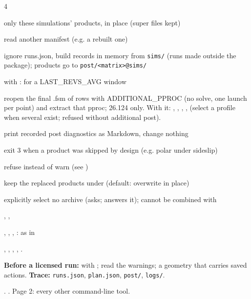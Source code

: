 \begin{multicols}{4}
\begin{flags}
\item {} only these simulations' products, in place (super files kept)
\item {} read another manifest (e.g. a rebuilt one)
\item {} ignore runs.json, build records in memory from \texttt{sims/} (runs made outside the package); products go to \texttt{post/<matrix>@sims/}
\item {} with : for a LAST\_REVS\_AVG window
\item {} reopen the final .fsm of rows with ADDITIONAL\_PPROC (no solve, one launch per point) and extract that pproc; 26.124 only. With it: , , , ,  (select a profile when several exist; refused without additional post).
\item {} print recorded post diagnostics as Markdown, change nothing
\item {} exit 3 when a product was skipped by design (e.g. polar under sideslip)
\item {} refuse instead of warn (see )
\item {} keep the replaced products under  (default: overwrite in place)
\item {} explicitly select no archive (asks;  answers it); cannot be combined with 
\item {}, , 
\item {}, , , : as in 
\end{flags}

, , , , .

\begin{tcolorbox}[colback=flag!6,colframe=flag,boxrule=0.3pt,left=2pt,right=2pt,top=1pt,bottom=1pt]
\textbf{Before a licensed run:}  with ; read the warnings;   a geometry that carries saved actions. \textbf{Trace:} \texttt{runs.json}, \texttt{plan.json}, \texttt{post/}, \texttt{logs/}.
\end{tcolorbox}
{\tiny \guidefootnotice. \pkgrepo. Page 2: every other command-line tool.}
\end{multicols}

